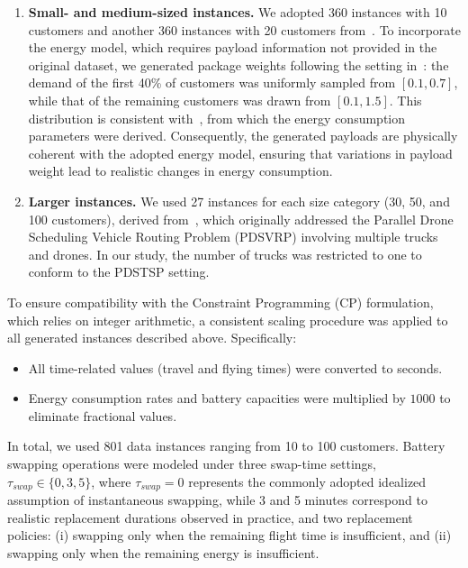 \documentclass[3p, authoryear, 11pt]{elsarticle}
\begin{document}
\begin{enumerate}
    \item \textbf{Small- and medium-sized instances.}  
    We adopted 360 instances with 10 customers and another 360 instances with 20 customers from~\cite{murray_flying_2015}.  
    To incorporate the energy model, which requires payload information not provided in the original dataset, we generated package weights following the setting in~\cite{cheng_drone_2020}:  
    the demand of the first 40\% of customers was uniformly sampled from $[0.1, 0.7]$, while that of the remaining customers was drawn from $[0.1, 1.5]$.  
    This distribution is consistent with~\cite{dorling_vehicle_2017}, from which the energy consumption parameters were derived.
    Consequently, the generated payloads are physically coherent with the adopted energy model, ensuring that variations in payload weight lead to realistic changes in energy consumption.

    \item \textbf{Larger instances.}  
    We used 27 instances for each size category (30, 50, and 100 customers), derived from~\cite{nguyen_min_cost_2022}, which originally addressed the Parallel Drone Scheduling Vehicle Routing Problem (PDSVRP) involving multiple trucks and drones.  
    In our study, the number of trucks was restricted to one to conform to the PDSTSP setting.  
\end{enumerate}


To ensure compatibility with the Constraint Programming (CP) formulation, which relies on integer arithmetic, a consistent scaling procedure was applied to all generated instances described above. Specifically:
\begin{itemize}
    \item All time-related values (travel and flying times) were converted to seconds.
    \item Energy consumption rates and battery capacities were multiplied by $1000$ to eliminate fractional values.
\end{itemize}





In total, we used 801 data instances ranging from 10 to 100 customers.  
Battery swapping operations were modeled under three swap-time settings, $\tau_{swap} \in \{0, 3, 5\}$, where $\tau_{swap}=0$ represents the commonly adopted idealized assumption of instantaneous swapping, while 3 and 5 minutes correspond to realistic replacement durations observed in practice, and two replacement policies:  
(i) swapping only when the remaining flight time is insufficient, and  
(ii) swapping only when the remaining energy is insufficient.
\end{document}
